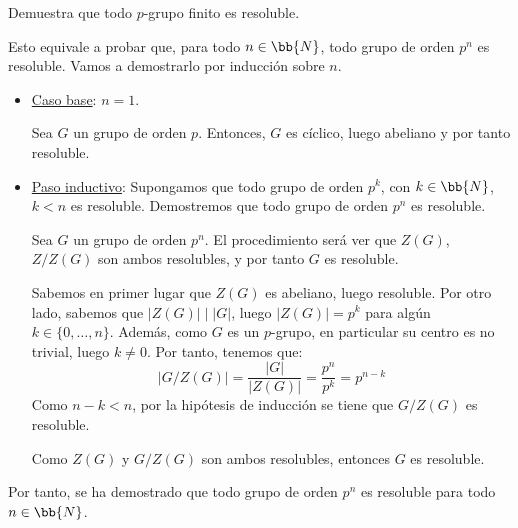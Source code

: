\begin{ejercicio}\label{ej:5.14}
    Demuestra que todo $p$-grupo finito es resoluble.


    Esto equivale a probar que, para todo $n\in\bb{N}$, todo grupo de orden $p^n$ es resoluble. Vamos a demostrarlo por inducción sobre $n$.
    \begin{itemize}
        \item \ul{Caso base}: $n=1$.
        
        Sea $G$ un grupo de orden $p$. Entonces, $G$ es cíclico, luego abeliano y por tanto resoluble.

        \item \ul{Paso inductivo}: Supongamos que todo grupo de orden $p^k$, con $k\in \bb{N}$, $k<n$ es resoluble. Demostremos que todo grupo de orden $p^{n}$ es resoluble.
        
        Sea $G$ un grupo de orden $p^{n}$. El procedimiento será ver que $Z(G)$, $Z/Z(G)$ son ambos resolubles, y por tanto $G$ es resoluble.
        

        Sabemos en primer lugar que $Z(G)$ es abeliano, luego resoluble. Por otro lado, sabemos que $|Z(G)|\mid |G|$, luego $|Z(G)|=p^k$ para algún $k\in\{0,\ldots,n\}$.
        Además, como $G$ es un $p$-grupo, en particular su centro es no trivial, luego $k\neq 0$.
        Por tanto, tenemos que:
        \begin{equation*}
            \left|G/Z(G)\right| = \dfrac{|G|}{|Z(G)|} = \dfrac{p^{n}}{p^k} = p^{n-k}
        \end{equation*}
        Como $n-k<n$, por la hipótesis de inducción se tiene que $G/Z(G)$ es resoluble.

        Como $Z(G)$ y $G/Z(G)$ son ambos resolubles, entonces $G$ es resoluble.
    \end{itemize}

    Por tanto, se ha demostrado que todo grupo de orden $p^n$ es resoluble para todo $n\in\bb{N}$.
\end{ejercicio}

